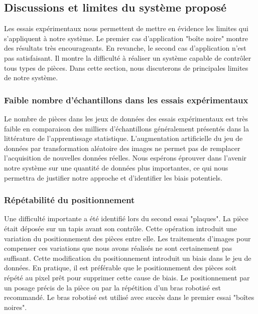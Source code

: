 \subsection{Discussions et limites du système proposé}
Les essais expérimentaux nous permettent de mettre en évidence les limites qui s'appliquent à notre système.
Le premier cas d'application "boîte noire" montre des résultats très encourageants.
En revanche, le second cas d'application n'est pas satisfaisant.
Il montre la difficulté à réaliser un système capable de contrôler tous types de pièces.
Dans cette section, nous discuterons de principales limites de notre système.

\subsubsection{Faible nombre d'échantillons dans les essais expérimentaux}
Le nombre de pièces dans les jeux de données des essais expérimentaux est très faible en comparaison des milliers d’échantillons généralement présentés dans la littérature de l'apprentissage statistique.
L'augmentation artificielle du jeu de données par transformation aléatoire des images ne permet pas de remplacer l'acquisition de nouvelles données réelles.
Nous espérons éprouver dans l'avenir notre système sur une quantité de données plus importantes, ce qui nous permettra de justifier notre approche et d'identifier les biais potentiels.

\subsubsection{Répétabilité du positionnement}
Une difficulté importante a été identifié lors du second essai "plaques".
La pièce était déposée sur un tapis avant son contrôle.
Cette opération introduit une variation du positionnement des pièces entre elle.
Les traitements d'images pour compenser ces variations que nous avons réalisés ne sont certainement pas suffisant.
Cette modification du positionnement introduit un biais dans le jeu de données.
En pratique, il est préférable que le positionnement des pièces soit répété au pixel prêt pour supprimer cette cause de biais.
Le positionnement par un posage précis de la pièce ou par la répétition d'un bras robotisé est recommandé.
Le bras robotisé est utilisé avec succès dans le premier essai "boîtes noires".

